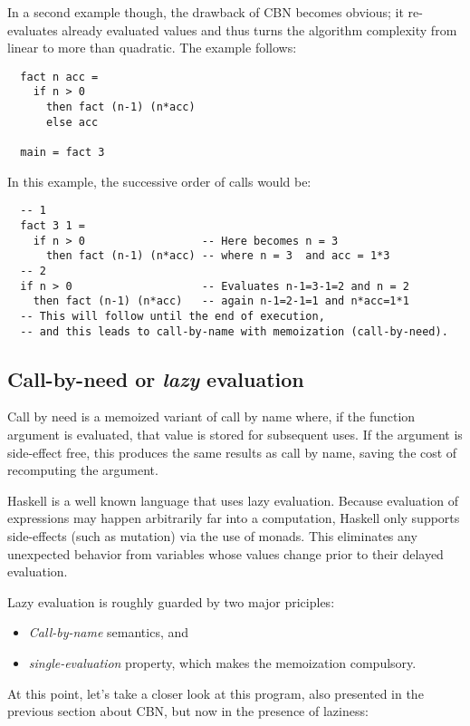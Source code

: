 \documentclass[diploma]{softlab-thesis}
\begin{document}
In a second example though, the drawback of CBN becomes obvious; it re-evaluates already evaluated values and thus 
turns the algorithm complexity from linear to more than quadratic. The example follows:

\begin{verbatim}
  fact n acc = 
    if n > 0 
      then fact (n-1) (n*acc)
      else acc

  main = fact 3
\end{verbatim}

In this example, the successive order of calls would be:
\begin{verbatim}
  -- 1 
  fact 3 1 = 
    if n > 0                  -- Here becomes n = 3
      then fact (n-1) (n*acc) -- where n = 3  and acc = 1*3
  -- 2
  if n > 0                    -- Evaluates n-1=3-1=2 and n = 2 
    then fact (n-1) (n*acc)   -- again n-1=2-1=1 and n*acc=1*1
  -- This will follow until the end of execution, 
  -- and this leads to call-by-name with memoization (call-by-need).
\end{verbatim}


\subsection {Call-by-need or \textit{lazy} evaluation }
\label{sec:lazy}

Call by need is a memoized variant of call by name where, if the function argument is evaluated, 
that value is stored for subsequent uses. If the argument is side-effect free, this produces the same results as call by name, 
saving the cost of recomputing the argument. 

Haskell is a well known language that uses lazy evaluation. Because evaluation of expressions may happen arbitrarily 
far into a computation, Haskell only supports side-effects (such as mutation) via the use of monads. This eliminates any 
unexpected behavior from variables whose values change prior to their delayed evaluation.
\newline
\par Lazy evaluation is roughly guarded by two major priciples:
\begin{itemize}
  \item \textit{Call-by-name} semantics, and
  \item \textit{single-evaluation} property, which makes the memoization compulsory.
\end{itemize}

At this point, let's take a closer look at this program, also presented in the previous section about CBN,
but now in the presence of laziness:
\end{document}
